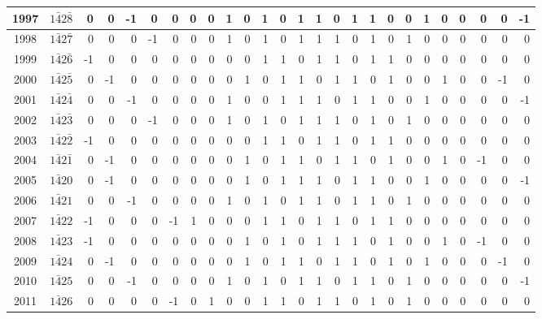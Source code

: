 \documentclass[12 pt]{article}%
\begin{document}
\begin{tiny}
\begin{centering}
\begin{longtable}{|c|c||rrrrrrrrrrrrrrrrrrrrrrrr|}
      \hline
      1997 & $1\bar42\bar8$ & 0 & 0 & -1 & 0 & 0 & 0 & 0 & 1 & 0 & 1 & 0 & 1 & 1 & 0 & 1 & 1 & 0 & 0 & 1 & 0 & 0 & 0 & 0 & -1 \\
      \hline
      1998 & $1\bar42\bar7$ & 0 & 0 & 0 & -1 & 0 & 0 & 0 & 1 & 0 & 1 & 0 & 1 & 1 & 1 & 0 & 1 & 0 & 1 & 0 & 0 & 0 & 0 & 0 & 0 \\
      \hline
      1999 & $1\bar42\bar6$ & -1 & 0 & 0 & 0 & 0 & 0 & 0 & 0 & 0 & 1 & 1 & 0 & 1 & 1 & 0 & 1 & 1 & 0 & 0 & 0 & 0 & 0 & 0 & 0 \\
      \hline
      2000 & $1\bar42\bar5$ & 0 & -1 & 0 & 0 & 0 & 0 & 0 & 0 & 1 & 0 & 1 & 1 & 0 & 1 & 1 & 0 & 1 & 0 & 0 & 1 & 0 & 0 & -1 & 0 \\
      \hline
      2001 & $1\bar42\bar4$ & 0 & 0 & -1 & 0 & 0 & 0 & 0 & 1 & 0 & 0 & 1 & 1 & 1 & 0 & 1 & 1 & 0 & 0 & 1 & 0 & 0 & 0 & 0 & -1 \\
      \hline
      2002 & $1\bar42\bar3$ & 0 & 0 & 0 & -1 & 0 & 0 & 0 & 1 & 0 & 1 & 0 & 1 & 1 & 1 & 0 & 1 & 0 & 1 & 0 & 0 & 0 & 0 & 0 & 0 \\
      \hline
      2003 & $1\bar42\bar2$ & -1 & 0 & 0 & 0 & 0 & 0 & 0 & 0 & 0 & 1 & 1 & 0 & 1 & 1 & 0 & 1 & 1 & 0 & 0 & 0 & 0 & 0 & 0 & 0 \\
      \hline
      2004 & $1\bar42\bar1$ & 0 & -1 & 0 & 0 & 0 & 0 & 0 & 0 & 1 & 0 & 1 & 1 & 0 & 1 & 1 & 0 & 1 & 0 & 0 & 1 & 0 & -1 & 0 & 0 \\
      \hline
      2005 & $1\bar420$ & 0 & -1 & 0 & 0 & 0 & 0 & 0 & 0 & 1 & 0 & 1 & 1 & 1 & 0 & 1 & 1 & 0 & 0 & 1 & 0 & 0 & 0 & 0 & -1 \\
      \hline
      2006 & $1\bar421$ & 0 & 0 & -1 & 0 & 0 & 0 & 0 & 1 & 0 & 1 & 0 & 1 & 1 & 0 & 1 & 1 & 0 & 1 & 0 & 0 & 0 & 0 & 0 & 0 \\
      \hline
      2007 & $1\bar422$ & -1 & 0 & 0 & 0 & -1 & 1 & 0 & 0 & 0 & 1 & 1 & 0 & 1 & 1 & 0 & 1 & 1 & 0 & 0 & 0 & 0 & 0 & 0 & 0 \\
      \hline
      2008 & $1\bar423$ & -1 & 0 & 0 & 0 & 0 & 0 & 0 & 0 & 1 & 0 & 1 & 0 & 1 & 1 & 1 & 0 & 1 & 0 & 0 & 1 & 0 & -1 & 0 & 0 \\
      \hline
      2009 & $1\bar424$ & 0 & -1 & 0 & 0 & 0 & 0 & 0 & 0 & 1 & 0 & 1 & 1 & 0 & 1 & 1 & 0 & 1 & 0 & 1 & 0 & 0 & 0 & -1 & 0 \\
      \hline
      2010 & $1\bar425$ & 0 & 0 & -1 & 0 & 0 & 0 & 0 & 1 & 0 & 1 & 0 & 1 & 1 & 0 & 1 & 1 & 0 & 1 & 0 & 0 & 0 & 0 & 0 & -1 \\
      \hline
      2011 & $1\bar426$ & 0 & 0 & 0 & 0 & -1 & 0 & 1 & 0 & 0 & 1 & 1 & 0 & 1 & 1 & 0 & 1 & 0 & 1 & 0 & 0 & 0 & 0 & 0 & 0 \\

\end{longtable}
\end{centering}
\end{tiny}
\end{document}
